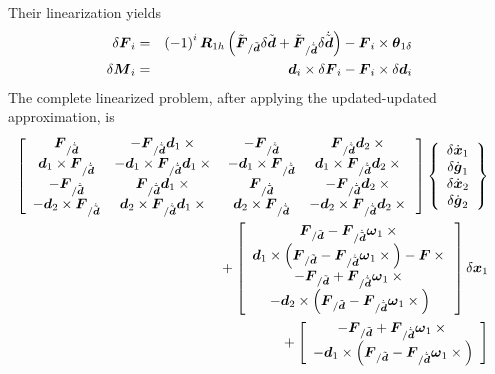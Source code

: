 \documentclass[10pt,dvips,fleqn]{report}
\newcommand{\T}[1]{\boldsymbol{#1}}
\begin{document}
Their linearization yields
\begin{eqnarray*}
	\delta\T{F}_i & = & \plbr{ -1 }^i \T{R}_{1h} \plbr{
		\tilde{\T{F}}_{/\tilde{\T{d}}} \delta{\tilde{\T{d}}}
		+ \tilde{\T{F}}_{/\dot{\tilde{\T{d}}}} \delta\dot{\tilde{\T{d}}}
	} - \T{F}_i \times \T{\theta}_{1\delta} \\
	\delta\T{M}_i & = & \T{d}_i \times \delta\T{F}_i
	- \T{F}_i \times \delta \T{d}_i
\end{eqnarray*}
The complete linearized problem, after applying the updated-updated 
approximation, is
\begin{eqnarray*}
	\sqbr{\matr{cccc}{
		\T{F}_{/\dot{\tilde{\T{d}}}} & -\T{F}_{/\dot{\tilde{\T{d}}}} \T{d}_1\times{} &
			- \T{F}_{/\dot{\tilde{\T{d}}}} & \T{F}_{/\dot{\tilde{\T{d}}}} \T{d}_2\times{} \\
		\T{d}_1 \times \T{F}_{/\dot{\tilde{\T{d}}}} &
			- \T{d}_1 \times \T{F}_{/\dot{\tilde{\T{d}}}} \T{d}_1\times{} &
			- \T{d}_1 \times \T{F}_{/\dot{\tilde{\T{d}}}} &
			\T{d}_1 \times \T{F}_{/\dot{\tilde{\T{d}}}} \T{d}_2\times{} \\
		- \T{F}_{/\dot{\tilde{\T{d}}}} & \T{F}_{/\dot{\tilde{\T{d}}}} \T{d}_1\times{} &
			\T{F}_{/\dot{\tilde{\T{d}}}} & - \T{F}_{/\dot{\tilde{\T{d}}}} \T{d}_2\times{} \\
		- \T{d}_2 \times \T{F}_{/\dot{\tilde{\T{d}}}} &
			\T{d}_2 \times \T{F}_{/\dot{\tilde{\T{d}}}} \T{d}_1\times{} &
			\T{d}_2 \times \T{F}_{/\dot{\tilde{\T{d}}}} &
			- \T{d}_2 \times \T{F}_{/\dot{\tilde{\T{d}}}} \T{d}_2\times{}
	}} \cubr{\cvvect{
		\delta\dot{\T{x}}_1 \\
		\delta\dot{\T{g}}_1 \\
		\delta\dot{\T{x}}_2 \\
		\delta\dot{\T{g}}_2
	}} & & \\
	\mbox{} + \sqbr{\cvvect{
		\T{F}_{/\tilde{\T{d}}} - \T{F}_{/\dot{\tilde{\T{d}}}} \T{\omega}_1 \times{} \\
		\T{d}_1 \times \plbr{\T{F}_{/\tilde{\T{d}}} - \T{F}_{/\dot{\tilde{\T{d}}}} \T{\omega}_1 \times{}}
			- \T{F}\times{} \\
		- \T{F}_{/\tilde{\T{d}}} + \T{F}_{/\dot{\tilde{\T{d}}}} \T{\omega}_1 \times{} \\
		- \T{d}_2 \times \plbr{\T{F}_{/\tilde{\T{d}}} - \T{F}_{/\dot{\tilde{\T{d}}}} \T{\omega}_1 \times{}}
	}} \delta\T{x}_1 & & \\
	\mbox{} + \sqbr{\cvvect{
		- \T{F}_{/\tilde{\T{d}}} + \T{F}_{/\dot{\tilde{\T{d}}}} \T{\omega}_1 \times{} \\
		- \T{d}_1 \times \plbr{\T{F}_{/\tilde{\T{d}}} - \T{F}_{/\dot{\tilde{\T{d}}}} \T{\omega}_1 \times{}}
}}
\end{eqnarray*}
\end{document}
